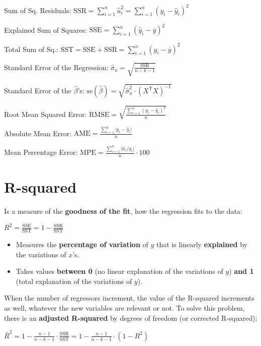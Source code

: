 \documentclass[10pt, a4paper, landscape]{extarticle}
\newcommand{\se}{\mathrm{se}}
\newcommand{\SSR}{\mathrm{SSR}}
\newcommand{\SSE}{\mathrm{SSE}}
\newcommand{\SST}{\mathrm{SST}}
\newcommand{\tr}{\mathsf{T}}
\begin{document}
\begin{multicols}{3}
Sum of Sq. Residuals: \hfill $\SSR = \sum_{i=1}^n \hat{u}_i^2 = \sum_{i=1}^n (y_i - \hat{y}_i)^2$

Explained Sum of Squares: \hfill $\SSE = \sum_{i=1}^n (\hat{y}_i - \overline{y})^2$

Total Sum of Sq.: \hfill $\SST = \SSE + \SSR = \sum_{i=1}^n (y_i - \overline{y})^2$

Standard Error of the Regression: \hfill $\hat{\sigma}_u = \sqrt{\frac{\SSR}{n - k - 1}}$

Standard Error of the $\hat{\beta}$'s: \hfill $\se(\hat{\beta}) = \sqrt{\hat{\sigma}^2_u \cdot (X^\tr X)^{-1}}$

Root Mean Squared Error: \hfill $\mathrm{RMSE} = \sqrt{\frac{\sum_{i=1}^n (y_i - \hat{y}_i)^2}{n}}$

Absolute Mean Error: \hfill $\mathrm{AME} = \frac{\sum_{i=1}^n \lvert y_i - \hat{y}_i \rvert}{n}$

Mean Percentage Error: \hfill $\mathrm{MPE} = \frac{\sum_{i=1}^n \lvert \hat{u}_i / y_i \rvert}{n} \cdot 100$

\columnbreak

\section*{R-squared}

Is a measure of the \textbf{goodness of the fit}, how the regression fits to the data:

\begin{center}
	$R^2 = \frac{\SSE}{\SST} = 1 - \frac{\SSR}{\SST}$
\end{center}

\begin{itemize}[leftmargin=*]
	\item Measures the \textbf{percentage of variation} of $y$ that is linearly \textbf{explained} by the variations of $x$'s.
	\item Takes values \textbf{between 0} (no linear explanation of the variations of $y$) \textbf{and 1} (total explanation of the variations of $y$).
\end{itemize}

When the number of regressors increment, the value of the R-squared increments as well, whatever the new variables are relevant or not. To solve this problem, there is an \textbf{adjusted R-squared} by degrees of freedom (or corrected R-squared):

\begin{center}
	$\overline{R}^2 = 1 - \frac{n - 1}{n - k - 1} \cdot \frac{\SSR}{\SST} = 1 - \frac{n - 1}{n - k - 1} \cdot (1 - R^2)$
\end{center}


\end{multicols}
\end{document}
